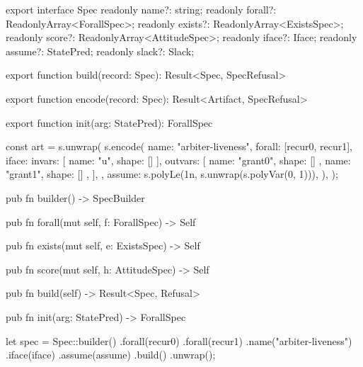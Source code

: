 \begin{tssrc}
export interface Spec {
  readonly name?: string;
  readonly forall?: ReadonlyArray<ForallSpec>;
  readonly exists?: ReadonlyArray<ExistsSpec>;
  readonly score?: ReadonlyArray<AttitudeSpec>;
  readonly iface?: Iface;
  readonly assume?: StatePred;
  readonly slack?: Slack;
}

export function build(record: Spec): Result<Spec, SpecRefusal>

export function encode(record: Spec): Result<Artifact, SpecRefusal>

export function init(arg: StatePred): ForallSpec
\end{tssrc}
\begin{tssrc}
const art = s.unwrap(
  s.encode({
    name: "arbiter-liveness",
    forall: [recur0, recur1],
    iface: {
      invars: [{ name: "u", shape: [] }],
      outvars: [
        { name: "grant0", shape: [] },
        { name: "grant1", shape: [] },
      ],
    },
    assume: s.polyLe(1n, s.unwrap(s.polyVar(0, 1))),
  }),
);
\end{tssrc}
\begin{rustsrc}
pub fn builder() -> SpecBuilder

pub fn forall(mut self, f: ForallSpec) -> Self

pub fn exists(mut self, e: ExistsSpec) -> Self

pub fn score(mut self, h: AttitudeSpec) -> Self

pub fn build(self) -> Result<Spec, Refusal>

pub fn init(arg: StatePred) -> ForallSpec
\end{rustsrc}
\begin{rustsrc}
let spec = Spec::builder()
    .forall(recur0)
    .forall(recur1)
    .name("arbiter-liveness")
    .iface(iface)
    .assume(assume)
    .build()
    .unwrap();
\end{rustsrc}

